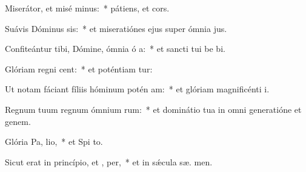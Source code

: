 \item Miserátor, et misé minus:~* pátiens, et  cors.
\item Suávis Dóminus sis:~* et miseratiónes ejus super ómnia  jus.
\item Confiteántur tibi, Dómine, ómnia ó a:~* et sancti tui be bi.
\item Glóriam regni  cent:~* et poténtiam  tur:
\item Ut notam fáciant fíliis hóminum potén am:~* et glóriam magnificénti  i.
\item Regnum tuum regnum ómnium rum:~* et dominátio tua in omni generatióne et genem.
\item Glória Pa,  lio,~* et Spi to.
\item Sicut erat in princípio, et ,  per,~* et in sǽcula sæ. men.
